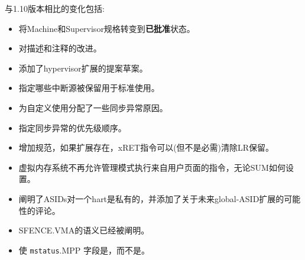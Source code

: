 与1.10版本相比的变化包括:
\vspace{-0.2in}
\begin{itemize}
  \parskip 0pt
  \itemsep 1pt
  \item 将Machine和Supervisor规格转变到{\bf 已批准}状态。
\item 对描述和注释的改进。
\item 添加了hypervisor扩展的提案草案。
\item 指定哪些中断源被保留用于标准使用。
\item 为自定义使用分配了一些同步异常原因。
\item 指定同步异常的优先级顺序。
\item 增加规范，如果扩展存在，xRET指令可以(但不是必需)清除LR保留。
\item 虚拟内存系统不再允许管理模式执行来自用户页面的指令，无论SUM如何设置。
\item 阐明了ASIDs对一个hart是私有的，并添加了关于未来global-ASID扩展的可能性的评论。
\item SFENCE.VMA的语义已经被阐明。
\item 使 {\tt mstatus}.MPP 字段是\warl，而不是\wlrl。

\end{itemize}
